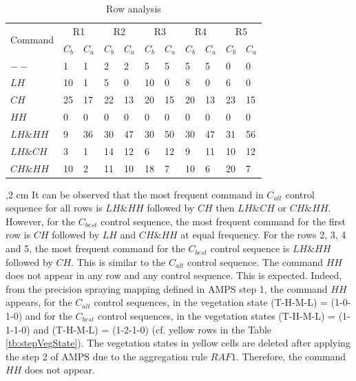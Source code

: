 \documentclass[preprint,3p,times,twocolumn]{elsarticle}
\begin{document}
\begin{table}[ht]
\begin{center}
\begin{tabular}{|l|l|l|l|l|l|l|l|l|l|l|}
\hline 
  \multirow{2}{*}{Command}	 & \multicolumn{2}{c|}{R1}  &  \multicolumn{2}{c|}{R2}  &  \multicolumn{2}{c|}{R3}  &  \multicolumn{2}{c|}{R4}  &  \multicolumn{2}{c|}{R5}  \\ 
  \cline{2-11}
            & $C_{b}$ & $C_{a}$   & $C_{b}$ & $C_{a}$   & $C_{b}$ & $C_{a}$   & $C_{b}$  & $C_{a}$  & $C_{b}$ & $C_{a}$  \\ \hline
$--$        & 1     &   1    & 2     &  2     & 5     & 5      & 5      & 5     & 0     & 0     \\ \hline
$LH$        & 10    &   1    & 5     &  0     & 10    & 0      & 8      & 0     & 6     & 0     \\ \hline
$CH$        & 25    &   17   & 22    &  13    & 20    & 15     & 20     & 13    & 23    & 15    \\ \hline
$HH$        & 0     &   0    & 0     &  0     & 0     & 0      & 0      & 0     & 0     & 0     \\ \hline
$LH \& HH$  & 9     &   36   & 30    &  47    & 30    & 50     & 30     & 47    & 31    & 56    \\ \hline
$LH \& CH$  & 3     &   1    & 14    &  12    & 6     & 12     & 9      & 11    & 10    & 12    \\ \hline
$CH \& HH$  & 10    &   2    & 11    &  10    & 18    & 7      & 10     & 6     & 20    & 7     \\ \hline

\end{tabular} 
\caption{Row analysis}\label{tb:stepAnalysis}
\end{center}
\end{table}
,2 cm
It can be observed that the most frequent command in $C_{alt}$ control sequence for all rows is $LH \& HH$ followed by $CH$ then $LH \& CH$ or $CH \& HH$. However, for the $C_{best}$ control sequence, the most frequent command for the first row is $CH$ followed by $LH$ and $CH \& HH$ at equal frequency. For the rows 2, 3, 4 and 5, the most frequent command for the $C_{best}$ control sequence is  $LH \& HH$ followed by $CH$. This is similar to the $C_{alt}$ control sequence. The command $HH$ does not appear in any row and any control sequence. This is expected. Indeed, from the precision spraying mapping defined in AMPS step 1, the command $HH$ appears, for the $C_{alt}$ control sequences, in the vegetation state (T-H-M-L) = (1-0-1-0) and for the $C_{best}$ control sequences, in the vegetation states (T-H-M-L) = (1-1-1-0) and (T-H-M-L) = (1-2-1-0) (cf. yellow rows in the Table \ref{tb:stepVegState}). The vegetation states in yellow cells are deleted after applying the step 2 of AMPS due to the aggregation rule $RAF1$. Therefore, the command $HH$ does not appear. 
\end{document}
